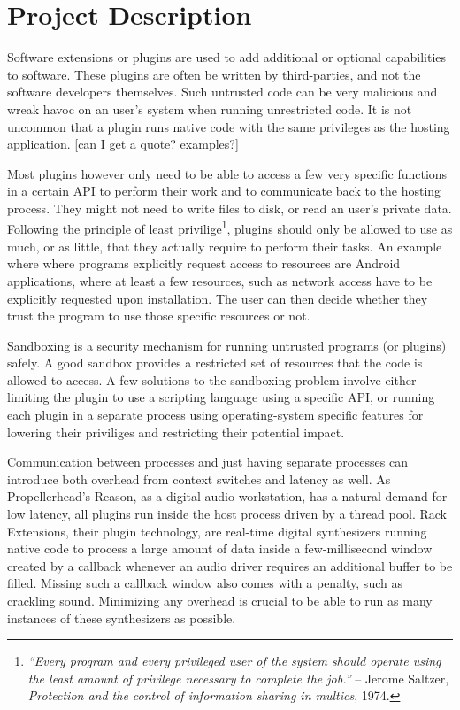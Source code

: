\chapter* {Project Description}

Software extensions or plugins are used to add additional or optional
capabilities to software. These plugins are often be written by third-parties,
and not the software developers themselves. Such untrusted code can be very
malicious and wreak havoc on an user's system when running unrestricted code. It
is not uncommon that a plugin runs native code with the same privileges as the
hosting application. [can I get a quote? examples?]

Most plugins however only need to be able to access a few very specific
functions in a certain API to perform their work and to communicate back to the
hosting process. They might not need to write files to disk, or read an user's
private data. Following the principle of least privilige\footnote{\emph{``Every
program and every privileged user of the system should operate using the least
amount of privilege necessary to complete the job.''} -- Jerome Saltzer,
\emph{Protection and the control of information sharing in multics}, 1974.},
plugins should only be allowed to use as much, or as little, that they actually
require to perform their tasks. An example where where programs explicitly
request access to resources are Android applications, where at least a few
resources, such as network access have to be explicitly requested upon
installation. The user can then decide whether they trust the program to use
those specific resources or not.

Sandboxing is a security mechanism for running untrusted programs (or plugins)
safely. A good sandbox provides a restricted set of resources that the code is
allowed to access. A few solutions to the sandboxing problem involve either
limiting the plugin to use a scripting language using a specific API, or running
each plugin in a separate process using operating-system specific features for
lowering their priviliges and restricting their potential impact.

Communication between processes and just having separate processes can introduce
both overhead from context switches and latency as well. As Propellerhead's
Reason, as a digital audio workstation, has a natural demand for low latency,
all plugins run inside the host process driven by a thread pool. Rack
Extensions, their plugin technology, are real-time digital synthesizers running
native code to process a large amount of data inside a few-millisecond window
created by a callback whenever an audio driver requires an additional buffer to
be filled. Missing such a callback window also comes with a penalty, such as
crackling sound. Minimizing any overhead is crucial to be able to run as many
instances of these synthesizers as possible.

